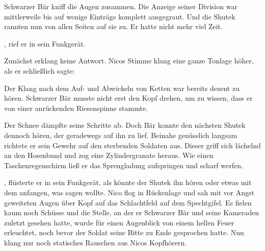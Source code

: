 \par

Schwarzer Bär kniff die Augen zusammen. Die Anzeige seiner Division war mittlerweile bis auf wenige Einträge komplett ausgegraut. Und die Shutek rannten nun von allen Seiten auf sie zu. Er hatte nicht mehr viel Zeit.

\par

, rief er in sein Funkgerät. 

\par

Zunächst erklang keine Antwort. Nicos Stimme klang eine ganze Tonlage höher, als er schließlich sagte: 

\par

Der Klang nach dem Auf- und Abwickeln von Ketten war bereits dezent zu hören. Schwarzer Bär musste nicht erst den Kopf drehen, um zu wissen, dass er von einer anrückenden Riesenspinne stammte.

\par


\par

Der Schnee dämpfte seine Schritte ab. Doch Bär konnte den nächsten Shutek dennoch hören, der geradewegs auf ihn zu lief. Beinahe genüsslich langsam richtete er sein Gewehr auf den sterbenden Soldaten aus. Dieser griff sich lächelnd an den Hosenbund und zog eine Zylindergranate heraus. Wie einen Taschenregenschirm ließ er das Sprengladung aufspringen und scharf werfen.

\par

, flüsterte er in sein Funkgerät, als könnte der Shutek ihn hören oder etwas mit dem anfangen, was sagen wollte. 
\ortswechsel
Nico flog in Rückenlage und sah mit vor Angst geweiteten Augen über Kopf auf das Schlachtfeld auf dem Spechtgifel. Es fielen kaum noch Schüsse und die Stelle, an der er Schwarzer Bär und seine Kameraden zuletzt gesehen hatte, wurde für einen Augenblick von einem hellen Feuer erleuchtet, noch bevor der Soldat seine Bitte zu Ende gesprochen hatte. Nun klang nur noch statisches Rauschen aus Nicos Kopfhörern.

